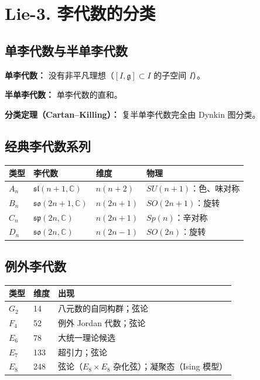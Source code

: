 \section{Lie-3. 李代数的分类}

\subsection{单李代数与半单李代数}

\textbf{单李代数：} 没有非平凡理想（$[I, \mathfrak{g}] \subset I$ 的子空间 $I$）。

\textbf{半单李代数：} 单李代数的直和。

\textbf{分类定理（Cartan--Killing）：} 复半单李代数完全由 Dynkin 图分类。

\subsection{经典李代数系列}

\begin{center}
\begin{tabular}{L{2cm}L{3cm}L{2cm}L{5cm}}
\toprule
\textbf{类型} & \textbf{李代数} & \textbf{维度} & \textbf{物理} \\
\midrule
$A_n$ & $\mathfrak{sl}(n+1, \mathbb{C})$ & $n(n+2)$ & $SU(n+1)$：色、味对称 \\
$B_n$ & $\mathfrak{so}(2n+1, \mathbb{C})$ & $n(2n+1)$ & $SO(2n+1)$：旋转 \\
$C_n$ & $\mathfrak{sp}(2n, \mathbb{C})$ & $n(2n+1)$ & $Sp(n)$：辛对称 \\
$D_n$ & $\mathfrak{so}(2n, \mathbb{C})$ & $n(2n-1)$ & $SO(2n)$：旋转 \\
\bottomrule
\end{tabular}
\end{center}

\subsection{例外李代数}

\begin{center}
\begin{tabular}{L{2cm}L{2cm}L{6cm}}
\toprule
\textbf{类型} & \textbf{维度} & \textbf{出现} \\
\midrule
$G_2$ & 14 & 八元数的自同构群；弦论 \\
$F_4$ & 52 & 例外 Jordan 代数；弦论 \\
$E_6$ & 78 & 大统一理论候选 \\
$E_7$ & 133 & 超引力；弦论 \\
$E_8$ & 248 & 弦论（$E_8 \times E_8$ 杂化弦）；凝聚态（Ising 模型） \\
\bottomrule
\end{tabular}
\end{center}

